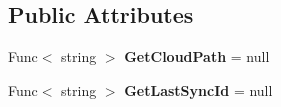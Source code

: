 \subsection*{Public Attributes}
\begin{DoxyCompactItemize}
\item 
\hypertarget{class_cloud_api_public_1_1_model_1_1_c_l_event_a993425773f97d5c97f5dfeca1f20927a}{Func$<$ string $>$ {\bfseries Get\-Cloud\-Path} = null}\label{class_cloud_api_public_1_1_model_1_1_c_l_event_a993425773f97d5c97f5dfeca1f20927a}

\item 
\hypertarget{class_cloud_api_public_1_1_model_1_1_c_l_event_a2a43e605a8089dc7bf7a8b2a097a98da}{Func$<$ string $>$ {\bfseries Get\-Last\-Sync\-Id} = null}\label{class_cloud_api_public_1_1_model_1_1_c_l_event_a2a43e605a8089dc7bf7a8b2a097a98da}

\end{DoxyCompactItemize}
